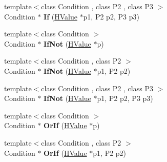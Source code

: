 \begin{DoxyCompactItemize}
\item 
\hypertarget{classv8_1_1internal_1_1_h_graph_builder_1_1_v8___f_i_n_a_l_a1d565b2d423f6cf5ff53004a9f9c77ce}{}{\footnotesize template$<$class Condition , class P2 , class P3 $>$ }\\Condition $\ast$ {\bfseries If} (\hyperlink{classv8_1_1internal_1_1_h_value}{H\+Value} $\ast$p1, P2 p2, P3 p3)\label{classv8_1_1internal_1_1_h_graph_builder_1_1_v8___f_i_n_a_l_a1d565b2d423f6cf5ff53004a9f9c77ce}

\item 
\hypertarget{classv8_1_1internal_1_1_h_graph_builder_1_1_v8___f_i_n_a_l_ad25af13efea4f2122870b49566c92b86}{}{\footnotesize template$<$class Condition $>$ }\\Condition $\ast$ {\bfseries If\+Not} (\hyperlink{classv8_1_1internal_1_1_h_value}{H\+Value} $\ast$p)\label{classv8_1_1internal_1_1_h_graph_builder_1_1_v8___f_i_n_a_l_ad25af13efea4f2122870b49566c92b86}

\item 
\hypertarget{classv8_1_1internal_1_1_h_graph_builder_1_1_v8___f_i_n_a_l_afb2b12a6a150def387ca4445c2573dbd}{}{\footnotesize template$<$class Condition , class P2 $>$ }\\Condition $\ast$ {\bfseries If\+Not} (\hyperlink{classv8_1_1internal_1_1_h_value}{H\+Value} $\ast$p1, P2 p2)\label{classv8_1_1internal_1_1_h_graph_builder_1_1_v8___f_i_n_a_l_afb2b12a6a150def387ca4445c2573dbd}

\item 
\hypertarget{classv8_1_1internal_1_1_h_graph_builder_1_1_v8___f_i_n_a_l_a54dd6219563d8dd64187aa70be7bbb0c}{}{\footnotesize template$<$class Condition , class P2 , class P3 $>$ }\\Condition $\ast$ {\bfseries If\+Not} (\hyperlink{classv8_1_1internal_1_1_h_value}{H\+Value} $\ast$p1, P2 p2, P3 p3)\label{classv8_1_1internal_1_1_h_graph_builder_1_1_v8___f_i_n_a_l_a54dd6219563d8dd64187aa70be7bbb0c}

\item 
\hypertarget{classv8_1_1internal_1_1_h_graph_builder_1_1_v8___f_i_n_a_l_ad973449fd7309fa7202e1d5bc76a836a}{}{\footnotesize template$<$class Condition $>$ }\\Condition $\ast$ {\bfseries Or\+If} (\hyperlink{classv8_1_1internal_1_1_h_value}{H\+Value} $\ast$p)\label{classv8_1_1internal_1_1_h_graph_builder_1_1_v8___f_i_n_a_l_ad973449fd7309fa7202e1d5bc76a836a}

\item 
\hypertarget{classv8_1_1internal_1_1_h_graph_builder_1_1_v8___f_i_n_a_l_a60d4c4820d8f8347fba57b5a4b2adf7f}{}{\footnotesize template$<$class Condition , class P2 $>$ }\\Condition $\ast$ {\bfseries Or\+If} (\hyperlink{classv8_1_1internal_1_1_h_value}{H\+Value} $\ast$p1, P2 p2)\label{classv8_1_1internal_1_1_h_graph_builder_1_1_v8___f_i_n_a_l_a60d4c4820d8f8347fba57b5a4b2adf7f}


\end{DoxyCompactItemize}
